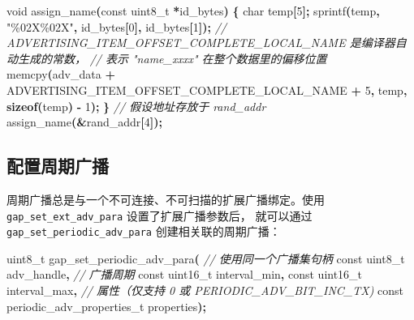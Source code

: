 \documentclass[
  12pt,
]{book}
\newenvironment{Shaded}{\begin{snugshade}}{\end{snugshade}}
\newcommand{\CommentTok}[1]{\textcolor[rgb]{0.56,0.35,0.01}{\textit{#1}}}
\newcommand{\DataTypeTok}[1]{\textcolor[rgb]{0.13,0.29,0.53}{#1}}
\newcommand{\DecValTok}[1]{\textcolor[rgb]{0.00,0.00,0.81}{#1}}
\newcommand{\KeywordTok}[1]{\textcolor[rgb]{0.13,0.29,0.53}{\textbf{#1}}}
\newcommand{\NormalTok}[1]{#1}
\newcommand{\OperatorTok}[1]{\textcolor[rgb]{0.81,0.36,0.00}{\textbf{#1}}}
\newcommand{\StringTok}[1]{\textcolor[rgb]{0.31,0.60,0.02}{#1}}
\begin{document}
\begin{enumerate}
\begin{Shaded}
\begin{Highlighting}[]
\DataTypeTok{void}\NormalTok{ assign\_name}\OperatorTok{(}\DataTypeTok{const} \DataTypeTok{uint8\_t} \OperatorTok{*}\NormalTok{id\_bytes}\OperatorTok{)}
\OperatorTok{\{}
    \DataTypeTok{char}\NormalTok{ temp}\OperatorTok{[}\DecValTok{5}\OperatorTok{];}
\NormalTok{    sprintf}\OperatorTok{(}\NormalTok{temp}\OperatorTok{,} \StringTok{"\%02X\%02X"}\OperatorTok{,}\NormalTok{ id\_bytes}\OperatorTok{[}\DecValTok{0}\OperatorTok{],}\NormalTok{ id\_bytes}\OperatorTok{[}\DecValTok{1}\OperatorTok{]);}
    \CommentTok{// ADVERTISING\_ITEM\_OFFSET\_COMPLETE\_LOCAL\_NAME 是编译器自动生成的常数，}
    \CommentTok{// 表示 "name\_xxxx" 在整个数据里的偏移位置}
\NormalTok{    memcpy}\OperatorTok{(}\NormalTok{adv\_data }\OperatorTok{+}\NormalTok{ ADVERTISING\_ITEM\_OFFSET\_COMPLETE\_LOCAL\_NAME }\OperatorTok{+} \DecValTok{5}\OperatorTok{,}
\NormalTok{           temp}\OperatorTok{,} \KeywordTok{sizeof}\OperatorTok{(}\NormalTok{temp}\OperatorTok{)} \OperatorTok{{-}} \DecValTok{1}\OperatorTok{);}
\OperatorTok{\}}
\CommentTok{// 假设地址存放于 rand\_addr}
\NormalTok{assign\_name}\OperatorTok{(\&}\NormalTok{rand\_addr}\OperatorTok{[}\DecValTok{4}\OperatorTok{]);}
\end{Highlighting}
\end{Shaded}
\end{enumerate}

\hypertarget{ux914dux7f6eux5468ux671fux5e7fux64ad}{%
\subsection{配置周期广播}\label{ux914dux7f6eux5468ux671fux5e7fux64ad}}

周期广播总是与一个不可连接、不可扫描的扩展广播绑定。使用 \texttt{gap\_set\_ext\_adv\_para} 设置了扩展广播参数后，
就可以通过 \texttt{gap\_set\_periodic\_adv\_para} 创建相关联的周期广播：

\begin{Shaded}
\begin{Highlighting}[]
\DataTypeTok{uint8\_t}\NormalTok{ gap\_set\_periodic\_adv\_para}\OperatorTok{(}
  \CommentTok{// 使用同一个广播集句柄}
  \DataTypeTok{const} \DataTypeTok{uint8\_t}\NormalTok{ adv\_handle}\OperatorTok{,}
  \CommentTok{// 广播周期}
  \DataTypeTok{const} \DataTypeTok{uint16\_t}\NormalTok{ interval\_min}\OperatorTok{,}
  \DataTypeTok{const} \DataTypeTok{uint16\_t}\NormalTok{ interval\_max}\OperatorTok{,}
  \CommentTok{// 属性（仅支持 0 或 PERIODIC\_ADV\_BIT\_INC\_TX)}
  \DataTypeTok{const}\NormalTok{ periodic\_adv\_properties\_t properties}\OperatorTok{);}
\end{Highlighting}
\end{Shaded}
\end{document}

